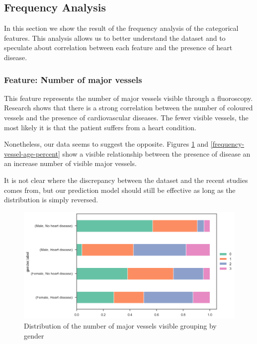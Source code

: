 \subsection{Frequency Analysis}

In this section we show the result of the frequency analysis of the categorical features. This analysis allows us to
better understand the dataset and to speculate about correlation between each feature and the presence of
heart disease.

\subsubsection{Feature: Number of major vessels}

This feature represents the number of major vessels visible through a fluoroscopy. Research \cite{Fluoroscopy} shows that
there is a strong correlation between the number of coloured vessels and the presence of cardiovascular diseases.
The fewer visible vessels, the most likely it is that the patient suffers from a heart condition.

Nonetheless, our data seems to suggest the opposite. Figures \ref{frequency-vessel-gender-percent} and \ref{frequency-vessel-age-percent}
show a visible relationship between the presence of disease an an increase number of visible major vessels.

It is not clear where the discrepancy between the dataset and the recent studies comes from, but our prediction
model should still be effective as long as the distribution is simply reversed.

\begin{figure}[H]
    \caption{Distribution of the number of major vessels visible grouping by gender}\label{frequency-vessel-gender-percent}
    \centering
    \includegraphics[width=\linewidth]{media/frequency-01-gender-vessels.png}
\end{figure}

